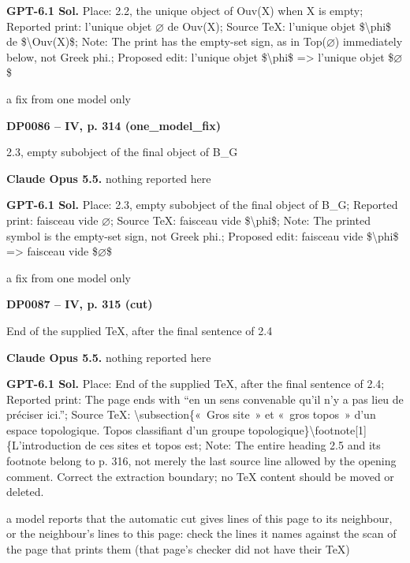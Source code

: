 \textbf{GPT-6.1 Sol.} Place: 2.2, the unique object of Ouv(X) when X is empty; Reported print: l'unique objet \ensuremath{\varnothing} de Ouv(X); Source TeX: l'unique objet \$\textbackslash{}phi\$ de \$\textbackslash{}Ouv(X)\$; Note: The print has the empty-set sign, as in Top(\ensuremath{\varnothing}) immediately below, not Greek phi.; Proposed edit: l'unique objet \$\textbackslash{}phi\$ =\allowbreak > l'unique objet \$\ensuremath{\varnothing}\$\par
a fix from one model only\par
\par\noindent\hypertarget{DP0086}{}\textbf{DP0086 -- IV, p. 314 (one\_model\_fix)}\par
2.3, empty subobject of the final object of B\_G\par
\textbf{Claude Opus 5.5.} nothing reported here\par
\textbf{GPT-6.1 Sol.} Place: 2.3, empty subobject of the final object of B\_G; Reported print: faisceau vide \ensuremath{\varnothing}; Source TeX: faisceau vide \$\textbackslash{}phi\$; Note: The printed symbol is the empty-set sign, not Greek phi.; Proposed edit: faisceau vide \$\textbackslash{}phi\$ =\allowbreak > faisceau vide \$\ensuremath{\varnothing}\$\par
a fix from one model only\par
\par\noindent\hypertarget{DP0087}{}\textbf{DP0087 -- IV, p. 315 (cut)}\par
End of the supplied TeX, after the final sentence of 2.4\par
\textbf{Claude Opus 5.5.} nothing reported here\par
\textbf{GPT-6.1 Sol.} Place: End of the supplied TeX, after the final sentence of 2.4; Reported print: The page ends with “en un sens convenable qu'il n'y a pas lieu de préciser ici.”; Source TeX: \textbackslash{}subsection\{«~Gros site~»  et «~gros topos~»  d'un espace topologique. Topos classifiant d'un groupe topologique\}\textbackslash{}footnote[1]\{L'introduction de ces sites et topos est; Note: The entire heading 2.5 and its footnote belong to p. 316, not merely the last source line allowed by the opening comment. Correct the extraction boundary; no TeX content should be moved or deleted.\par
a model reports that the automatic cut gives lines of this page to its neighbour, or the neighbour's lines to this page: check the lines it names against the scan of the page that prints them (that page's checker did not have their TeX)\par
